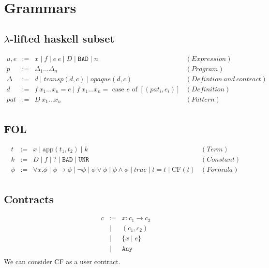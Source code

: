 \documentclass{article}
\begin{document}
\newcommand{\etrans}[1]{\mathcal{E} \llbracket #1 \rrbracket}
\newcommand{\dtrans}[1]{\mathcal{D} \llbracket #1 \rrbracket}
\newcommand{\strans}[1]{\mathcal{S} \llbracket #1 \rrbracket}
\newcommand{\trans}[1]{\llbracket #1 \rrbracket}

\newcommand{\unr}{\texttt{UNR}}
\newcommand{\bad}{\texttt{BAD}}
\newcommand{\any}{\texttt{Any}}
\newcommand{\ok}{\texttt{Ok}}

\thispagestyle{empty}
\section{Grammars}
\subsection{$\lambda$-lifted haskell subset}
\begin{eqnarray*}
  u,e &:=& x \mid f \mid e~e \mid D \mid \bad \mid n & (Expression)\\
  p &:=& \Delta_1 \dots \Delta_n & (Program)\\
  \Delta &:=& d \mid transp (d,c) \mid opaque (d,c) & (Defintion~and~contract)\\
  d &:=& f~x_1 \dots x_n = e \mid f~x_1 \dots x_n = \mbox{ case } e \mbox{ of } [(pat_i,e_i)] & (Definition)\\
  pat &:=&D~x_1 \dots x_n & (Pattern)\\
\end{eqnarray*}

\subsection{FOL}
\begin{eqnarray*}
  t &:=& x \mid \mbox{app}(t_1,t_2) \mid k & (Term)\\
  k &:=& D \mid f \mid ? \mid \bad \mid \unr & (Constant)\\
  \phi &:=& \forall x.\phi \mid \phi \to \phi \mid \lnot \phi \mid \phi \lor \phi \mid \phi \land \phi \mid true \mid t=t \mid \mbox{CF}(t)& (Formula)\\
\end{eqnarray*}

\subsection{Contracts}
\begin{eqnarray*}
  c &:=& x:c_1 \to c_2\\
  &\mid& (c_1,c_2) \\
  &\mid& \{ x \mid e \}\\
  &\mid& \any \\
\end{eqnarray*}
We can consider CF as a user contract.
\end{document}
